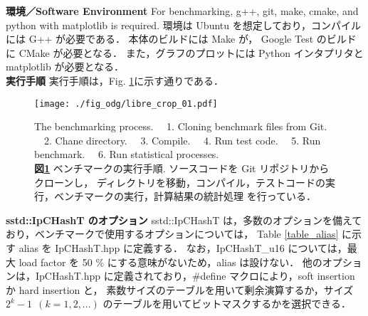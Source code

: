
\newpage
{\bf 環境／Software Environment}
\samepage\newline\indent
For benchmarking, g++, git, make, cmake, and python with matplotlib is required.
\samepage\newline\indent
環境は Ubuntu を想定しており，コンパイルには G++ が必要である．
本体のビルドには Make が，
Google Test のビルドに CMake が必要となる．
また，グラフのプロットには Python インタプリタと matplotlib が必要となる．
\\

{\bf 実行手順}
\samepage\newline\indent
実行手順は，Fig. \ref{fig_command}に示す通りである．
\begin{figure}[h]
  \texttt{[image: ./fig\_odg/libre\_crop\_01.pdf]}
  \caption{
    The benchmarking process. \ \ 
    1. Cloning benchmark files from Git. \ \ 
    2. Chane directory. \ \ 
    3. Compile. \ \ 
    4. Run test code. \ \ 
    5. Run benchmark. \ \ 
    6. Run statistical processes.
    \\
    {\bf 図\ref{fig_command}}
    ベンチマークの実行手順.
    ソースコードを Git リポジトリからクローンし，
    ディレクトリを移動，コンパイル，テストコードの実行，ベンチマークの実行，計算結果の統計処理
    を行っている．
  }
  \label{fig_command}
\end{figure}

{\bf sstd::IpCHashT のオプション}
\samepage\newline\indent
sstd::IpCHashT は，多数のオプションを備えており，ベンチマークで使用するオプションについては，
Table \ref{table_alias} に示す alias を IpCHashT.hpp に定義する．
なお，IpCHashT\_u16 については，最大 load factor を 50 \% にする意味がないため，alias は設けない．
他のオプションは，IpCHashT.hpp に定義されており，\#define マクロにより，soft insertion か hard insertion と，
素数サイズのテーブルを用いて剰余演算するか，サイズ $2^k-1\ \ (k=1,2,...)$ のテーブルを用いてビットマスクするかを選択できる．

